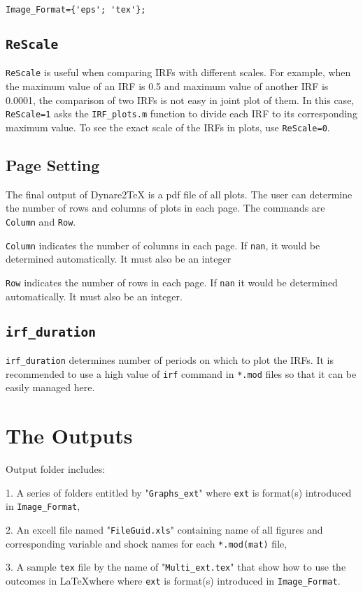 \documentclass[11pt,a4paper]{article}
\begin{document}
\begin{lstlisting} 
Image_Format={'eps'; 'tex'};
\end{lstlisting}
    
\subsection{\texttt{ReScale}}
\texttt{ReScale} is useful when comparing IRFs with different scales. For example, when the maximum value of an IRF is 0.5 and maximum value of another IRF is 0.0001, the comparison of two IRFs is not easy in joint plot of them. In this case, \texttt{ReScale=1} asks the \texttt{IRF\_plots.m} function to divide each IRF to its corresponding maximum value. To see the exact scale of the IRFs in plots, use \texttt{ReScale=0}.
\subsection{Page Setting}
The final output of Dynare2TeX is a pdf file of all plots. The user can determine the number of rows and columns of plots in each page. The commands are \texttt{Column} and \texttt{Row}.
 
\texttt{Column} indicates the number of columns in each page. If \texttt{nan}, it would be determined automatically. It must also be an integer

\texttt{Row} indicates the number of rows in each page. If \texttt{nan} it would be 
determined automatically. It must also be an integer.
\subsection{\texttt{irf_duration}}
\texttt{irf_duration} determines number of periods on which to plot the IRFs. It is recommended to use a high value of \texttt{irf} command in \texttt{*.mod} files so that it can be easily managed here.

\section{The Outputs}
Output folder includes:

1. A series of folders entitled by "\texttt{Graphs\_ext}" where \texttt{ext} is format(s) introduced in \texttt{Image_Format},

2. An excell file named "\texttt{FileGuid.xls}" containing name of all figures
and corresponding variable and shock names for each \texttt{*.mod(mat)} file,

3. A sample \texttt{tex} file by the name of "\texttt{Multi\_ext.tex}" that show how to use the outcomes in \LaTeX where where \texttt{ext} is format(s) introduced in \texttt{Image_Format}.
\end{document}

